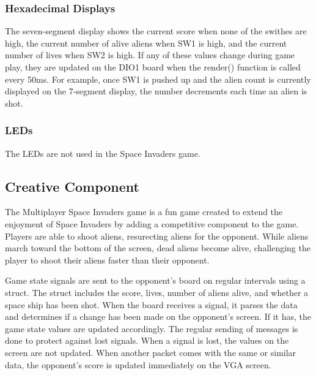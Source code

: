 \documentclass[11pt,letter,oneside]{report}
\begin{document}
\subsubsection{Hexadecimal Displays}
The seven-segment display shows the current score when none of the swithes are high, the current number of alive aliens when SW1 is high, and the current number of lives when SW2 is high. If any of these values change during game play, they are updated on the DIO1 board when the render() function is called every 50ms. For example, once SW1 is pushed up and the alien count is currently displayed on the 7-segment display, the number decrements each time an alien is shot.

\subsubsection{LEDs}
The LEDs are not used in the Space Invaders game.


\subsection{Creative Component}

The Multiplayer Space Invaders game is a fun game created to extend the enjoyment of Space Invaders by adding a competitive component to the game. Players are able to shoot aliens, resurecting aliens for the opponent. While aliens march toward the bottom of the screen, dead aliens become alive, challenging the player to shoot their aliens faster than their opponent.

Game state signals are sent to the opponent's board on regular intervals using a struct. The struct includes the score, lives, number of aliens alive, and whether a space ship has been shot. When the board receives a signal, it parses the data and determines if a change has been made on the opponent's screen. If it has, the game state values are updated accordingly. The regular sending of messages is done to protect against lost signals. When a signal is lost, the values on the screen are not updated. When another packet comes with the same or similar data, the opponent's score is updated immediately on the VGA screen.
\end{document}
